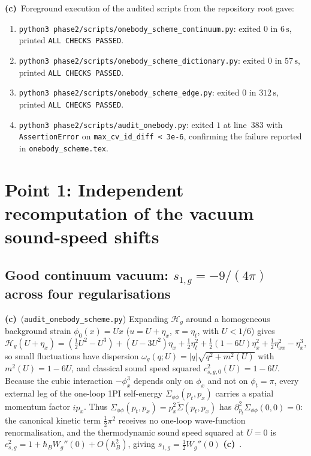 \documentclass[11pt,a4paper]{article}
\newcommand{\Lc}{\textbf{(c)}\ }
\newcommand{\scr}{\texttt{audit\_\allowbreak onebody\_\allowbreak scheme.py}}
\begin{document}
\Lc Foreground execution of the audited scripts from the repository root gave:
\begin{enumerate}
  \item \texttt{python3 phase2/scripts/onebody\_\allowbreak scheme\_\allowbreak continuum.py}: exited $0$ in $6\,\mathrm{s}$, printed \texttt{ALL CHECKS PASSED}.
  \item \texttt{python3 phase2/scripts/onebody\_\allowbreak scheme\_\allowbreak dictionary.py}: exited $0$ in $57\,\mathrm{s}$, printed \texttt{ALL CHECKS PASSED}.
  \item \texttt{python3 phase2/scripts/onebody\_\allowbreak scheme\_\allowbreak edge.py}: exited $0$ in $312\,\mathrm{s}$, printed \texttt{ALL CHECKS PASSED}.
  \item \texttt{python3 phase2/scripts/audit\_\allowbreak onebody.py}: exited $1$ at line~383 with \texttt{AssertionError} on \texttt{max\_cv\_id\_diff < 3e-6}, confirming the failure reported in \texttt{onebody\_\allowbreak scheme.tex}.
\end{enumerate}

\section{Point 1: Independent recomputation of the vacuum sound-speed shifts}

\subsection{\texorpdfstring{Good continuum vacuum: $s_{1,g} = -9/(4\pi)$ across four regularisations}{Good continuum vacuum: s1g = -9/(4 pi) across four regularisations}}
\Lc (\scr) Expanding $\mathcal{H}_g$ around a homogeneous background strain
$\phi_0(x) = Ux$ ($u = U + \eta_x$, $\pi = \eta_t$, with $U < 1/6$) gives
\begin{equation}
  \mathcal{H}_g(U+\eta_x) = \left(\tfrac{1}{2}U^2 - U^3\right)
  + (U - 3U^2)\eta_x
  + \tfrac{1}{2}\eta_t^2 + \tfrac{1}{2}(1-6U)\eta_x^2 + \tfrac{1}{2}\eta_{xx}^2 - \eta_x^3,
\end{equation}
so small fluctuations have dispersion $\omega_g(q;U) = |q|\sqrt{q^2 + m^2(U)}$
with $m^2(U) = 1 - 6U$, and classical sound speed squared $c_{s,g,0}^2(U) = 1 - 6U$.
Because the cubic interaction $-\phi_x^3$ depends only on $\phi_x$ and not on
$\phi_t = \pi$, every external leg of the one-loop 1PI self-energy
$\Sigma_{\phi\phi}(p_t,p_x)$ carries a spatial momentum factor $ip_x$. Thus
$\Sigma_{\phi\phi}(p_t,p_x) = p_x^2\widetilde{\Sigma}(p_t,p_x)$ has
$\partial_{p_t}^2\Sigma_{\phi\phi}(0,0) = 0$: the canonical kinetic term
$\frac{1}{2}\pi^2$ receives no one-loop wave-function renormalisation, and the
thermodynamic sound speed squared at $U=0$ is $c_{s,g}^2 = 1 + \hbar_B W_g''(0) + O(\hbar_B^2)$,
giving $s_{1,g} = \frac{1}{2}W_g''(0)$ \Lc.
\end{document}
